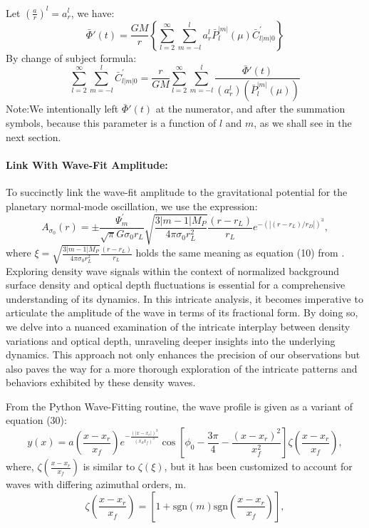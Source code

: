 \documentclass[conference]{IEEEtran}
\begin{document}
Let $(\frac{a}{r})^{l} = a_{r}^{l}$, we have:
\begin{equation}\bar{\Phi}{'}(t) = \frac{GM}{r}\left\{\sum_{l=2}^{\infty}\sum_{m=-l}^{l}a_{r}^{l}\bar{P}_{l}^{|m|}(\mu)\bar{C}_{l|m|0}^{'}\right\}
\end{equation}
By change of subject formula:
\begin{equation}
\sum_{l=2}^{\infty}\sum_{m=-l}^{l}\bar{C}_{l|m|0}^{'} =\frac{r}{GM} \sum_{l=2}^{\infty}\sum_{m=-l}^{l}\frac{\bar{\Phi}{'}(t)}{(a_{r}^{l})(\bar{P}_{l}^{|m|}(\mu))}
\end{equation}
Note:We intentionally left $\bar{\Phi}{'}(t)$ at the numerator, and after the summation symbols, because this parameter is a function of $l$ and $m$, as we shall see in the next section. 
\vspace{3}
\paragraph{Link With Wave-Fit Amplitude:}
\vspace{3}
To succinctly link the wave-fit amplitude to the gravitational potential for the planetary normal-mode oscillation, we use the expression: 
\begin{equation}
A_{\sigma_{0}}(r) = \pm \frac{\Psi_{m}^{'}}{\sqrt{\pi}G\sigma_{0} r_{L}} \sqrt{\frac{3|m - 1|M_{P}}{4 \pi \sigma_{0}r_{L}^{2}}} \frac{(r - r_{L})}{r_{L}}e^{-(|(r - r_{L})/r_{D}|)^{3}},
\end{equation}
where $\xi = \sqrt{\frac{3|m - 1|M_{P}}{4 \pi \sigma_{0}r_{L}^{2}}}\frac{(r - r_{L})}{r_{L}}$ holds the same meaning as equation (10) from \cite{Nicholson1990AnAR}. Exploring density wave signals within the context of normalized background surface density and optical depth fluctuations is essential for a comprehensive understanding of its dynamics. In this intricate analysis, it becomes imperative to articulate the amplitude of the wave in terms of its fractional form. By doing so, we delve into a nuanced examination of the intricate interplay between density variations and optical depth, unraveling deeper insights into the underlying dynamics. This approach not only enhances the precision of our observations but also paves the way for a more thorough exploration of the intricate patterns and behaviors exhibited by these density waves.

From the Python Wave-Fitting routine, the wave profile is given as a variant of equation (30):
\begin{equation}
y(x) = a(\frac{x-x_{r}}{x_{f}})e^{-\frac{(|x-x_{r}|)^{3}}{(x_{d}x_{f})^{3}}}\cos\left[\phi_{0} - \frac{3\pi}{4} - \frac{{(x-x_{r})^2}}{{x_{f}^{2}}}\right]\zeta(\frac{x-x_{r}}{x_{f}}),
\end{equation}
where, $\zeta(\frac{x-x_{r}}{x_{f}})$ is similar to $\zeta(\xi)$, but it has been customized to account for waves with differing azimuthal orders, m.
\begin{equation}
\zeta(\frac{x-x_{r}}{x_{f}}) = [1 + \mathrm{sgn}(m) \mathrm{sgn}(\frac{x-x_{r}}{x_{f}})],
\end{equation} 
\end{document}
